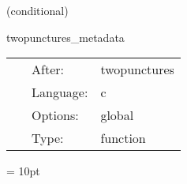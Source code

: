 \vspace{5mm}

   (conditional) 

\hspace{5mm} twopunctures\_metadata 

\hspace{5mm}{\it output twopunctures metadata } 


\hspace{5mm}

 \begin{tabular*}{160mm}{cll} 
~ & After:  & twopunctures \\ 
~ & Language:  & c \\ 
~ & Options:  & global \\ 
~ & Type:  & function \\ 
\end{tabular*} 



\vspace{5mm}\parskip = 10pt 

